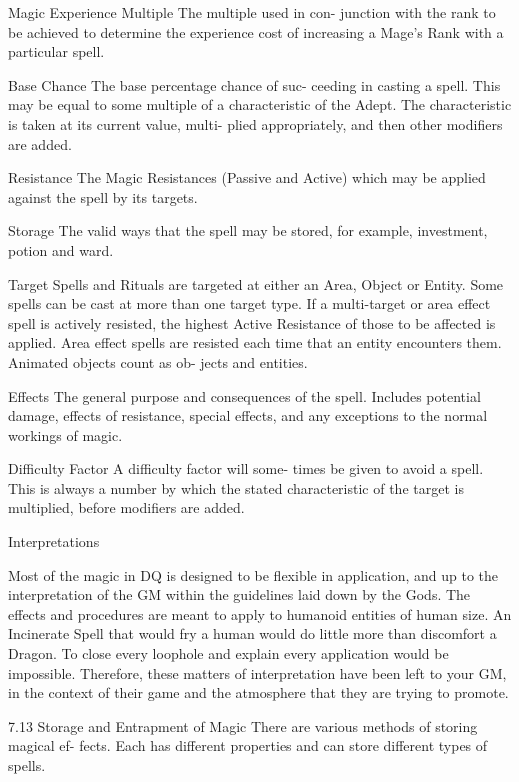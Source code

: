 \begin{Chapter}{Magic}
Experience  Multiple  The  multiple  used  in  con-
junction with the rank to be achieved to determine 
the  experience  cost  of  increasing  a  Mage’s  Rank 
with a particular spell. 

Base  Chance  The  base  percentage  chance  of  suc-
ceeding  in  casting  a  spell.  This  may  be  equal  to 
some multiple of a characteristic of the Adept. The 
characteristic  is  taken  at  its  current  value,  multi-
plied  appropriately,  and  then  other  modifiers  are 
added. 

Resistance  The  Magic  Resistances  (Passive  and 
Active)  which may be applied against the spell by 
its targets. 

Storage  The  valid  ways  that  the  spell  may  be 
stored, for example, investment, potion and ward. 

Target Spells and Rituals are targeted at either an 
Area,  Object  or  Entity.  Some  spells  can be  cast  at 
more than one target type. If a multi-target or area 
effect  spell  is  actively  resisted,  the  highest  Active 
Resistance  of those  to  be affected  is applied.  Area 
effect  spells  are  resisted  each  time  that  an  entity 
encounters  them.  Animated  objects  count  as  ob-
jects and entities. 

Effects  The  general  purpose  and  consequences  of 
the  spell.  Includes  potential  damage,  effects  of 
resistance,  special  effects,  and  any  exceptions  to 
the normal workings of magic. 

Difficulty  Factor  A  difficulty  factor  will  some-
times  be  given  to  avoid  a  spell.  This  is  always  a 
number  by  which  the  stated  characteristic  of  the 
target is multiplied, before modifiers are added. 

Interpretations 

Most of the magic in DQ is designed to be flexible 
in  application,  and  up  to  the  interpretation  of  the 
GM  within  the  guidelines  laid  down  by  the  Gods. 
The  effects  and  procedures  are  meant  to  apply  to 
humanoid  entities  of  human  size.  An  Incinerate 
Spell that would fry a human would do little more 
than discomfort a Dragon. To close every loophole 
and explain every application would be impossible. 
Therefore,  these  matters  of  interpretation  have 
been left to your GM, in the context of their game 
and the atmosphere that they are trying to promote. 

7.13 Storage and Entrapment of Magic 
There  are  various  methods  of  storing  magical  ef-
fects.  Each  has  different  properties  and  can  store 
different types of spells. 


\end{Chapter}
